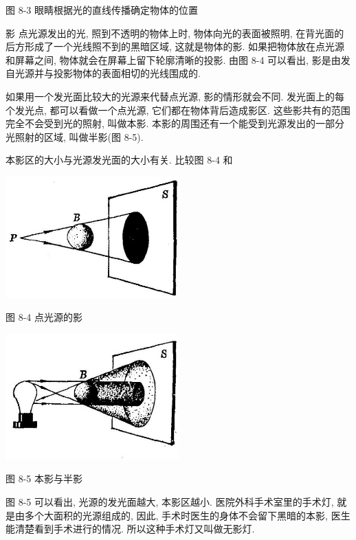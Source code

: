 \documentclass[10pt]{article}
\begin{document}
图 8-3 眼睛根据光的直线传播确定物体的位置

影 点光源发出的光, 照到不透明的物体上时, 物体向光的表面被照明, 在背光面的后方形成了一个光线照不到的黑暗区域, 这就是物体的影. 如果把物体放在点光源和屏幕之间, 物体就会在屏幕上留下轮廓清晰的投影. 由图 8-4 可以看出, 影是由发自光源并与投影物体的表面相切的光线围成的.

如果用一个发光面比较大的光源来代替点光源, 影的情形就会不同. 发光面上的每个发光点, 都可以看做一个点光源, 它们都在物体背后造成影区. 这些影共有的范围完全不会受到光的照射, 叫做本影. 本影的周围还有一个能受到光源发出的一部分光照射的区域, 叫做半影(图 8-5).

本影区的大小与光源发光面的大小有关. 比较图 8-4 和

\begin{center}
\includegraphics[max width=0.5\textwidth]{images/01913056-1f15-74d8-9184-9aab52c9d66b_246_374977.jpg}
\end{center}

图 8-4 点光源的影

\begin{center}
\includegraphics[max width=0.5\textwidth]{images/01913056-1f15-74d8-9184-9aab52c9d66b_246_294733.jpg}
\end{center}

图 8-5 本影与半影

图 8-5 可以看出, 光源的发光面越大, 本影区越小. 医院外科手术室里的手术灯, 就是由多个大面积的光源组成的, 因此, 手术时医生的身体不会留下黑暗的本影, 医生能清楚看到手术进行的情况. 所以这种手术灯又叫做无影灯.
\end{document}
